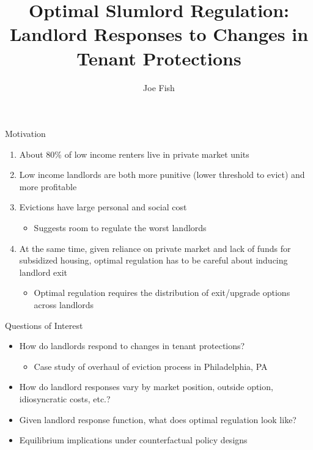\documentclass[10pt, xcolor=dvipsnames]{beamer}
\date{}
\title[Landlord Responses to Changes in Tenant Protections]{Optimal Slumlord Regulation: \\Landlord Responses to Changes in Tenant Protections} %
\author[Joe Fish]{Joe Fish}
\begin{document}
\begin{frame}
\titlepage %
\end{frame}

\begin{frame}{Motivation}
    \begin{enumerate}
        \item About 80\% of low income renters live in private market units \parencite{jchs_2024, nhpd2024profiles}
        \pause
        \item Low income landlords are both more punitive (lower threshold to evict) and more profitable \parencite{Desmond_2019, Eisfeldt_2015,Damen_2025}
        \item Evictions have large personal and social cost \parencite{desmond-evicted,humphries2025, collison-et-al-2023}
        \begin{itemize}
            \item Suggests room to regulate the worst landlords
        \end{itemize}
        \pause
        \item At the same time, given reliance on private market and lack of funds for subsidized housing, optimal regulation has to be careful about inducing landlord exit
        \begin{itemize}
            \item Optimal regulation requires the distribution of exit/upgrade options across landlords
        \end{itemize}
    \end{enumerate}

\end{frame}


\begin{frame}{Questions of Interest}
    \begin{itemize}
        \item How do landlords respond to changes in tenant protections?
        \begin{itemize}
           \item Case study of overhaul of eviction process in Philadelphia, PA
        \end{itemize}
         \item How do landlord responses vary by market position, outside option, idiosyncratic costs, etc.?
         \item Given landlord response function, what does optimal regulation look like?
         \item Equilibrium implications under counterfactual policy designs
    \end{itemize}
\end{frame}
\end{document}
